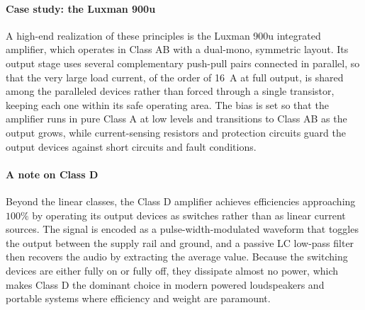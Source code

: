 \paragraph{Case study: the Luxman 900u} A high-end realization of these principles is the Luxman 900u integrated amplifier, which operates in Class AB with a dual-mono, symmetric layout.
Its output stage uses several complementary push-pull pairs connected in parallel, so that the very large load current, of the order of \SI{16}{\ampere} at full output, is shared among the paralleled devices rather than forced through a single transistor, keeping each one within its safe operating area.
The bias is set so that the amplifier runs in pure Class A at low levels and transitions to Class AB as the output grows, while current-sensing resistors and protection circuits guard the output devices against short circuits and fault conditions.

\paragraph{A note on Class D} Beyond the linear classes, the Class D amplifier achieves efficiencies approaching \(100\%\) by operating its output devices as switches rather than as linear current sources.
The signal is encoded as a pulse-width-modulated waveform that toggles the output between the supply rail and ground, and a passive LC low-pass filter then recovers the audio by extracting the average value.
Because the switching devices are either fully on or fully off, they dissipate almost no power, which makes Class D the dominant choice in modern powered loudspeakers and portable systems where efficiency and weight are paramount.
